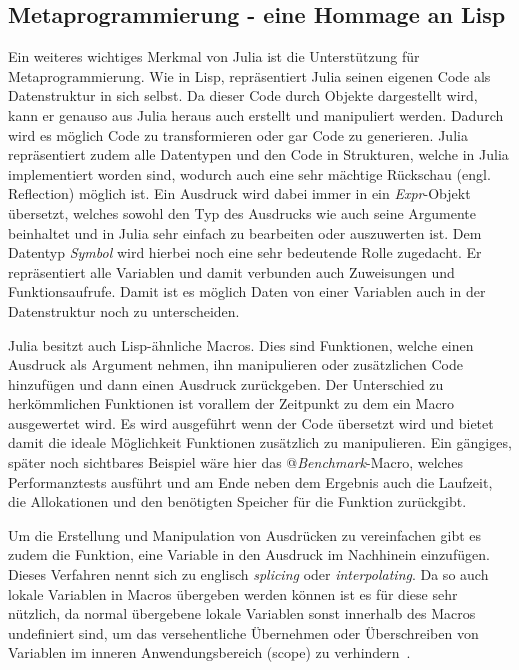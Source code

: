\documentclass[proseminar,german,utf8]{zihpub}
\begin{document}
\subsection{Metaprogrammierung - eine Hommage an Lisp}

Ein weiteres wichtiges Merkmal von Julia ist die Unterstützung für Metaprogrammierung. Wie in Lisp, repräsentiert Julia seinen eigenen Code als Datenstruktur in sich selbst. Da dieser Code durch Objekte dargestellt wird, kann er genauso aus Julia heraus auch erstellt und manipuliert werden. Dadurch wird es möglich Code zu transformieren oder gar Code zu generieren. Julia repräsentiert zudem alle Datentypen und den Code in Strukturen, welche in Julia implementiert worden sind, wodurch auch eine sehr mächtige Rückschau (engl. Reflection) möglich ist. Ein Ausdruck wird dabei immer in ein \textit{Expr}-Objekt übersetzt, welches sowohl den Typ des Ausdrucks wie auch seine Argumente beinhaltet und in Julia sehr einfach zu bearbeiten oder auszuwerten ist. Dem Datentyp \textit{Symbol} wird hierbei noch eine sehr bedeutende Rolle zugedacht. Er repräsentiert alle Variablen und damit verbunden auch Zuweisungen und Funktionsaufrufe. Damit ist es möglich Daten von einer Variablen auch in der Datenstruktur noch zu unterscheiden. 

Julia besitzt auch Lisp-ähnliche Macros. Dies sind Funktionen, welche einen Ausdruck als Argument nehmen, ihn manipulieren oder zusätzlichen Code hinzufügen und dann einen Ausdruck zurückgeben. Der Unterschied zu herkömmlichen Funktionen ist vorallem der Zeitpunkt zu dem ein Macro ausgewertet wird. Es wird ausgeführt wenn der Code übersetzt wird und bietet damit die ideale Möglichkeit Funktionen zusätzlich zu manipulieren. Ein gängiges, später noch sichtbares Beispiel wäre hier das @\textit{Benchmark}-Macro, welches Performanztests ausführt und am Ende neben dem Ergebnis auch die Laufzeit, die Allokationen und den benötigten Speicher für die Funktion zurückgibt. 

Um die Erstellung und Manipulation von Ausdrücken zu vereinfachen gibt es zudem die Funktion, eine Variable in den Ausdruck im Nachhinein einzufügen. Dieses Verfahren nennt sich zu englisch \textit{splicing} oder \textit{interpolating}. Da so auch lokale Variablen in Macros übergeben werden können ist es für diese sehr nützlich, da normal übergebene lokale Variablen sonst innerhalb des Macros undefiniert sind, um das versehentliche Übernehmen oder Überschreiben von Variablen im inneren Anwendungsbereich (scope) zu verhindern~\cite{JuliaLangDocumentation}.
\end{document}
